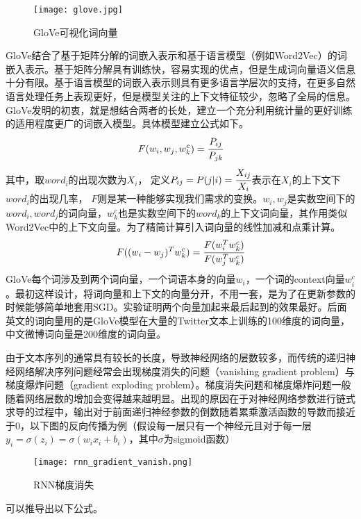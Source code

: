 \begin{figure}[htbp]
	\centering
	\texttt{[image: glove.jpg]}
	\caption[rnn_vanish]{GloVe可视化词向量}
\end{figure}

GloVe结合了基于矩阵分解的词嵌入表示和基于语言模型（例如Word2Vec）的词嵌入表示。基于矩阵分解具有训练快，容易实现的优点，但是生成词向量语义信息十分有限。基于语言模型的词嵌入表示则具有更多语言学层次的支持，在更多自然语言处理任务上表现更好，但是模型关注的上下文特征较少，忽略了全局的信息。GloVe发明的初衷，就是想结合两者的长处，建立一个充分利用统计量的更好训练的适用程度更广的词嵌入模型。具体模型建立公式如下。
\begin{equation} F(w_i,w_j,w^c_k) = \cfrac{P_{ij}}{P_{jk}}  \end{equation}
其中，取$word_i$的出现次数为$X_i$， 定义$P_{ij}=P(j|i)=\cfrac{X_{ij}}{X_{i}}$表示在$X_i$的上下文下$word_i$的出现几率， $F$则是某一种能够实现我们需求的变换。$w_i,w_j$是实数空间下的$word_i,word_j$的词向量，$w^c_k$也是实数空间下的$word_k$的上下文词向量，其作用类似Word2Vec中的上下文向量。为了精简计算引入词向量的线性加减和点乘计算。
\begin{equation} F((w_i-w_j)^Tw^c_k) = \cfrac{F(w^T_iw^c_k)}{{F(w^T_jw^c_k)}} \end{equation}
GloVe每个词涉及到两个词向量，一个词语本身的向量$w_i$，一个词的context向量$w^c_i$。最初这样设计，将词向量和上下文的向量分开，不用一套，是为了在更新参数的时候能够简单地套用SGD。实验证明两个向量加起来最后起到的效果最好。后面英文的词向量用的是GloVe模型在大量的Twitter文本上训练的100维度的词向量，中文微博词向量是200维度的词向量。

由于文本序列的通常具有较长的长度，导致神经网络的层数较多，而传统的递归神经网络解决序列问题经常会出现梯度消失的问题（vanishing gradient problem）与梯度爆炸问题（gradient exploding problem）。梯度消失问题和梯度爆炸问题一般随着网络层数的增加会变得越来越明显。出现的原因在于对神经网络参数进行链式求导的过程中，输出对于前面递归神经参数的倒数随着累乘激活函数的导数而接近于0，以下图的反向传播为例（假设每一层只有一个神经元且对于每一层$y_i=\sigma(z_i)=\sigma(w_ix_i+b_i)$，其中$\sigma$为sigmoid函数）

\begin{figure}[htbp]
	\centering
	\texttt{[image: rnn\_gradient\_vanish.png]}
	\caption[rnn_vanish]{RNN梯度消失}
\end{figure}

可以推导出以下公式。

